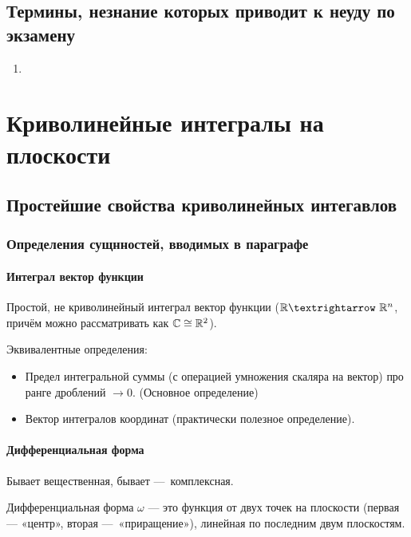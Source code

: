 \documentclass[12pt, a4paper]{book}
\begin{document}
\section{Термины, незнание которых приводит к неуду по экзамену}

\begin{enumerate}
    \item <Дофига всего>
\end{enumerate}


\chapter{Криволинейные интегралы на плоскости}

\section{Простейшие свойства криволинейных интегавлов}

\subsection{Определения сущнностей, вводимых в параграфе}

\subsubsection{Интеграл вектор функции}

Простой, не криволинейный интеграл вектор функции ($\sR → \sR^n$, причём можно рассматривать как ${\mathbb{C}} \cong {\mathbb{R}}^2$).

Эквивалентные определения:
\begin{itemize}
    \item Предел интегральной суммы (с операцией умножения скаляра на вектор) про ранге дроблений $→ 0$. (Основное определение)
    \item Вектор интегралов координат (практически полезное определение).
\end{itemize}

\subsubsection{Дифференциальная форма}

Бывает вещественная, бывает — комплексная.

Дифференциальная форма $\omega$ — это функция от двух точек на плоскости (первая — «центр», вторая — «приращение»), линейная по последним двум плоскостям.
\end{document}
